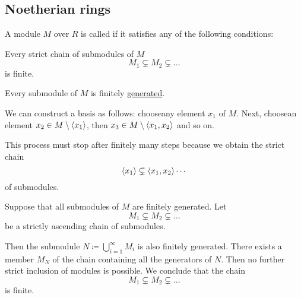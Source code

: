 \subsection{Noetherian rings}\label{subsec:noetherian_rings}

\begin{Definition}\label{def:noetherian_module}\cite[proposition 8.30]{Knapp2016BAlg}
  A module \( M \) over \( R \) is called  if it satisfies any of the following conditions:
  \begin{DefEnum}
     Every strict chain of submodules of \( M \)
    \begin{equation*}
      M_1 \subsetneq M_2 \subsetneq \ldots
    \end{equation*}
    is finite.

     Every submodule of \( M \) is finitely \hyperref[def:free_left_module]{generated}.
  \end{DefEnum}
\end{Definition}
\begin{RefListProof}
     We can construct a basis as follows: choose\AOC any element \( x_1 \) of \( M \). Next, choose\AOC an element \( x_2 \in M \setminus \left\langle x_1 \right\rangle \), then \( x_3 \in M \setminus \left\langle x_1, x_2 \right\rangle \) and so on.

    This process must stop after finitely many steps because we obtain the strict chain
    \begin{equation*}
      \left\langle x_1 \right\rangle \subsetneq \left\langle x_1, x_2 \right\rangle \cdots
    \end{equation*}
    of submodules.

     Suppose that all submodules of \( M \) are finitely generated. Let
    \begin{equation*}
      M_1 \subsetneq M_2 \subsetneq \ldots
    \end{equation*}
    be a strictly ascending chain of submodules.

    Then the submodule \( N \coloneqq \bigcup_{i=1}^\infty M_i \) is also finitely generated. There exists a member \( M_N \) of the chain containing all the generators of \( N \). Then no further strict inclusion of modules is possible. We conclude that the chain
    \begin{equation*}
      M_1 \subsetneq M_2 \subsetneq \ldots
    \end{equation*}
    is finite.
\end{RefListProof}

